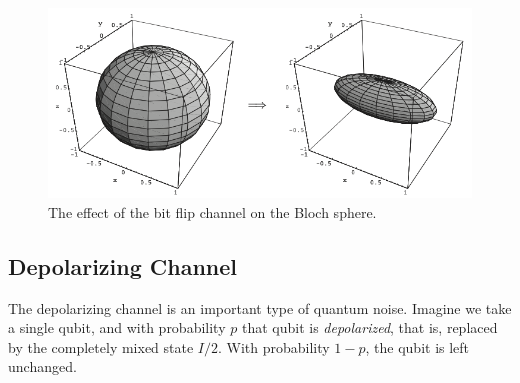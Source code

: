 \documentclass{article}
\begin{document}
    \begin{definition}

      \begin{figure}[H]
        \centering 
        \includegraphics[scale=0.4]{img/bit_flip_channel.png}
        \caption{The effect of the bit flip channel on the Bloch sphere.} 
        \label{fig:bit_flip_channel}
      \end{figure}
    \end{definition}

    \begin{lemma}

    \end{lemma}

  \subsection{Depolarizing Channel}

    The depolarizing channel is an important type of quantum noise. Imagine we take a single qubit, and with probability $p$ that qubit is \textit{depolarized}, that is, replaced by the completely mixed state $I/2$. With probability $1 - p$, the qubit is left unchanged.
\end{document}
